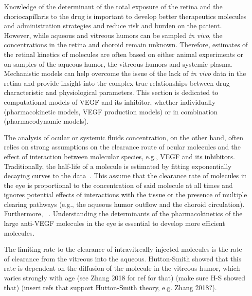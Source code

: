 \documentclass[11pt,a4paper]{article}
\begin{document}
Knowledge of the determinant of the total exposure of the retina and the choriocapillaris to the drug is important to develop better therapeutics molecules and administration strategies and reduce risk and burden on the patient.
However, while aqueous and vitreous humors can be sampled \textit{in vivo}, the concentrations in the retina and choroid remain unknown. 
Therefore, estimates of the retinal kinetics of molecules are often based on either animal experiments or on samples of the aqueous humor, the vitreous humors and systemic plasma.
Mechanistic models can help overcome the issue of the lack of \textit{in vivo} data in the retina and provide insight into the complex true relationships between drug characteristic and physiological parameters.
This section is dedicated to computational models of VEGF and its inhibitor, whether individually (pharmacokinetic models, VEGF production models) or in combination (pharmacodynamic models).


The analysis of ocular or systemic fluids concentration, on the other hand, often relies on strong assumptions on the clearance route of ocular molecules and the effect of interaction between molecular species, e.g., VEGF and its inhibitors.
Traditionally, the half-life of a molecule is estimated by fitting exponentially decaying curves to the data~\cite{Bakri_2007, Park_2015, Park_2016, Xu_2013}.
This assume that the clearance rate of molecules in the eye is proportional to the concentration of said molecule at all times and ignores potential effects of interactions with the tissue or the presence of multiple clearing pathways (e.g., the aqueous humor outflow and the choroid circulation).
Furthermore, ~\cite{Lamminsalo_2018, Missel_2012}.
Understanding the determinants of the pharmacokinetics of the large anti-VEGF molecules in the eye is essential to develop more efficient molecules.

The limiting rate to the clearance of intravitreally injected molecules is the rate of clearance from the vitreous into the aqueous.
Hutton-Smith showed that this rate is dependent on the diffusion of the molecule in the vitreous humor, which varies strongly with age (see Zhang 2018 for ref for that) (make sure H-S showed that) (insert refs that support Hutton-Smith theory, e.g. Zhang 2018?).
\end{document}
